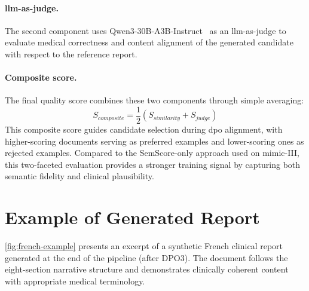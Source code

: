 \paragraph{\gls{llm}-as-judge.}
The second component uses Qwen3-30B-A3B-Instruct~\citep{yang2025qwen3} as an \gls{llm}-as-judge to evaluate medical correctness and content alignment of the generated candidate with respect to the reference report.

\paragraph{Composite score.}
The final quality score combines these two components through simple averaging:
\begin{equation}
    S_{composite} = \frac{1}{2}\left(S_{similarity} + S_{judge}\right)
\end{equation}
This composite score guides candidate selection during \gls{dpo} alignment, with higher-scoring documents serving as preferred examples and lower-scoring ones as rejected examples.
Compared to the SemScore-only approach used on \gls{mimic}-III, this two-faceted evaluation provides a stronger training signal by capturing both semantic fidelity and clinical plausibility.

\section{Example of Generated Report}

\autoref{fig:french-example} presents an excerpt of a synthetic French clinical report generated at the end of the pipeline (after DPO3).
The document follows the eight-section narrative structure and demonstrates clinically coherent content with appropriate medical terminology.

